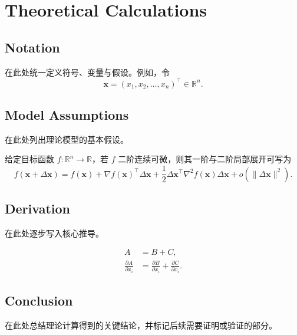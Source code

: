 \section{Theoretical Calculations}

\subsection{Notation}

在此处统一定义符号、变量与假设。例如，令
\begin{equation}
    \bm{x} = (x_1, x_2, \dots, x_n)^\top \in \mathbb{R}^n .
\end{equation}

\subsection{Model Assumptions}

在此处列出理论模型的基本假设。

\begin{definition}
给定目标函数 $f:\mathbb{R}^n \to \mathbb{R}$，若 $f$ 二阶连续可微，则其一阶与二阶局部展开可写为
\begin{equation}
    f(\bm{x} + \Delta \bm{x})
    =
    f(\bm{x})
    + \nabla f(\bm{x})^\top \Delta \bm{x}
    + \frac{1}{2}\Delta \bm{x}^\top \nabla^2 f(\bm{x}) \Delta \bm{x}
    + o(\|\Delta \bm{x}\|^2).
\end{equation}
\end{definition}

\subsection{Derivation}

在此处逐步写入核心推导。

\begin{align}
    A &= B + C, \\
    \frac{\partial A}{\partial x_i}
      &= \frac{\partial B}{\partial x_i}
       + \frac{\partial C}{\partial x_i}.
\end{align}

\subsection{Conclusion}

在此处总结理论计算得到的关键结论，并标记后续需要证明或验证的部分。
